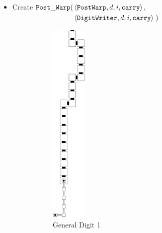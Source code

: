 \begin{itemize}
            \item
            Create
            $\begin{aligned}[t]
                {\tt Post\_Warp}(& \left \langle {\tt PostWarp},    d, i, {\tt carry} \right\rangle, \\
                          & \left \langle {\tt DigitWriter}, d, i, {\tt carry} \right\rangle \;)
            \end{aligned}$

            \begin{figure}[H]
                \begin{subfigure}[t]{0.2\textwidth}
                    \centering
                    \includegraphics[width=0.2\textwidth]{warping/post_warp_general_digit1}
                    \caption{\label{fig:warping/post_warp_general_digit1} General Digit 1}
                \end{subfigure}%
                ~
                \begin{subfigure}[t]{0.2\textwidth}
                    \centering

\end{subfigure}
\end{figure}
\end{itemize}
